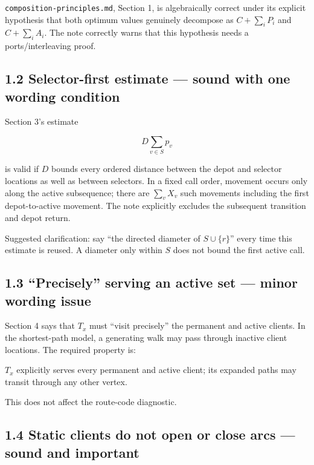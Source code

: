 \documentclass[11pt,a4paper]{article}
\begin{document}
\nolinkurl{composition-principles.md}, Section 1, is algebraically correct under its explicit hypothesis that both optimum values genuinely decompose as \(C+\sum_i P_i\) and \(C+\sum_i A_i\).  The note correctly warns that this hypothesis needs a ports/interleaving proof.


\subsection*{1.2 Selector-first estimate — sound with one wording condition}

Section 3's estimate


\[
 D\sum_{v\in S}p_v
\]

is valid if \(D\) bounds every ordered distance between the depot and selector locations as well as between selectors.  In a fixed call order, movement occurs only along the active subsequence; there are \(\sum_v X_v\) such movements including the first depot-to-active movement. The note explicitly excludes the subsequent transition and depot return.


Suggested clarification: say “the directed diameter of \(S\cup\{r\}\)” every time this estimate is reused.  A diameter only within \(S\) does not bound the first active call.


\subsection*{1.3 “Precisely” serving an active set — minor wording issue}

Section 4 says that \(T_x\) must “visit precisely” the permanent and active clients.  In the shortest-path model, a generating walk may pass through inactive client locations.  The required property is:


\begin{ResearchQuote}

\(T_x\) explicitly serves every permanent and active client; its expanded paths may transit through any other vertex.

\end{ResearchQuote}

This does not affect the route-code diagnostic.


\subsection*{1.4 Static clients do not open or close arcs — sound and important}
\end{document}
